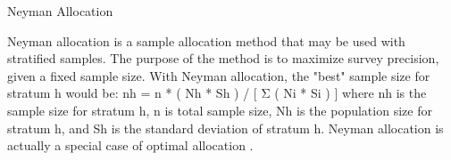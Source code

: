 Neyman Allocation

Neyman allocation is a sample allocation method that may be used with stratified samples. The purpose of the method is to maximize survey precision, given a fixed sample size. With Neyman allocation, the "best" sample size for stratum h would be:
nh = n * ( Nh * Sh ) / [ Σ ( Ni * Si ) ]
where nh is the sample size for stratum h, n is total sample size, Nh is the population size for stratum h, and Sh is the standard deviation of stratum h.
Neyman allocation is actually a special case of optimal allocation .
